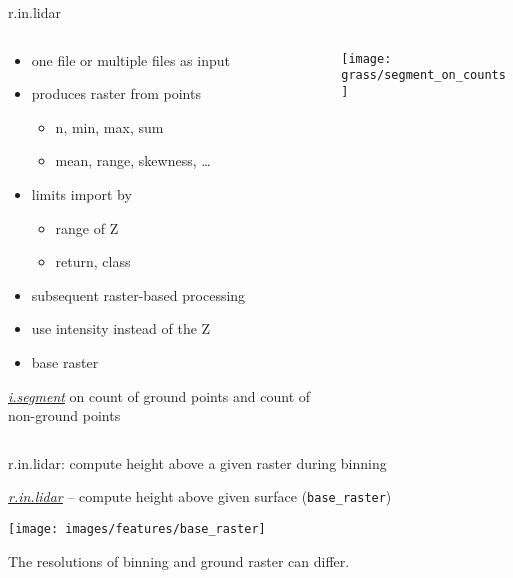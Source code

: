 \documentclass[xcolor={dvipsnames,usenames},beamer,aspectratio=169]{beamer}
\newcommand{\gmodule}[1]{\href{http://grass.osgeo.org/grass71/manuals/#1.html}{\emph{#1}}}
\begin{document}
\begin{frame}{r.in.lidar}

\begin{columns}
\begin{column}{0.4\textwidth}


\begin{itemize}
  \item one file or multiple files as input
  \item produces raster from points
  \begin{itemize}
    \item n, min, max, sum
    \item mean, range, skewness, \ldots
  \end{itemize}
  \item limits import by
  \begin{itemize}
    \item range of Z
    \item return, class
  \end{itemize}
  \item subsequent raster-based processing
  \item use intensity instead of the Z
  \item base raster
\end{itemize}

\begin{flushright}
\footnotesize
\gmodule{i.segment} on count of ground points and count of non-ground points
\end{flushright}

\end{column}
\begin{column}{0.45\textwidth}

\begin{center}
  \texttt{[image: grass/segment\_on\_counts]}
\end{center}


\end{column}
\end{columns}

\end{frame}

\begin{frame}{r.in.lidar: compute height above a given raster during binning}

\gmodule{r.in.lidar} -- compute height above given surface (\texttt{base\_raster})

\begin{center}
\texttt{[image: images/features/base\_raster]}
\end{center}

The resolutions of binning and ground raster can differ.

\end{frame}
\end{document}
